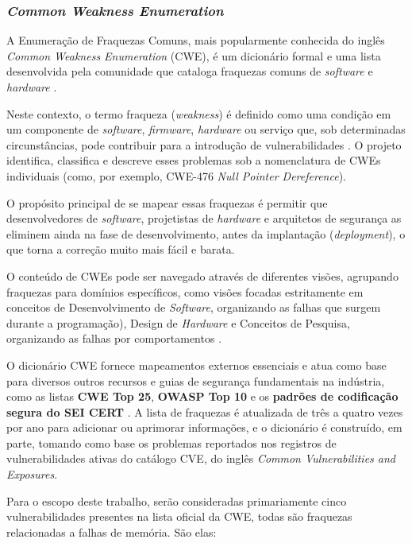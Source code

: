 \documentclass[
    12pt,                %
    openright,           %
    oneside,             %
    a4paper,             %
    english,             %
    brazil               %
]{abntex2}
\begin{document}
\begin{itemize}
\subsubsection{\textit{Common Weakness Enumeration}}
\label{sec:cwes}
\par
A Enumeração de Fraquezas Comuns, mais popularmente conhecida do inglês \textit{Common Weakness Enumeration} (CWE), é um dicionário formal e uma lista desenvolvida pela comunidade que cataloga fraquezas comuns de \textit{software} e \textit{hardware} \cite{mitrecwe}.
\par
Neste contexto, o termo fraqueza (\textit{weakness}) é definido como uma condição em um componente de \textit{software}, \textit{firmware}, \textit{hardware} ou serviço que, sob determinadas circunstâncias, pode contribuir para a introdução de vulnerabilidades \cite{mitrecwe}.
O projeto identifica, classifica e descreve esses problemas sob a nomenclatura de CWEs individuais (como, por exemplo, CWE-476 \textit{Null Pointer Dereference}).
\par
O propósito principal de se mapear essas fraquezas é permitir que desenvolvedores de \textit{software}, projetistas de \textit{hardware} e arquitetos de segurança as eliminem ainda na fase de desenvolvimento, antes da implantação (\textit{deployment}), o que torna a correção muito mais fácil e barata.
\par 
O conteúdo de CWEs pode ser navegado através de diferentes visões, agrupando fraquezas para domínios específicos, como visões focadas estritamente em conceitos de Desenvolvimento de \textit{Software}, organizando as falhas que surgem durante a programação), Design de \textit{Hardware} e Conceitos de Pesquisa, organizando as falhas por comportamentos \cite{mitrecwe}.
\par
O dicionário CWE fornece mapeamentos externos essenciais e atua como base para diversos outros recursos e guias de segurança fundamentais na indústria, como as listas \textbf{CWE Top 25}, \textbf{OWASP Top 10} e os \textbf{padrões de codificação segura do SEI CERT} \cite{mitrecwe, seicertc2016}.
A lista de fraquezas é atualizada de três a quatro vezes por ano para adicionar ou aprimorar informações, e o dicionário é construído, em parte, tomando como base os problemas reportados nos registros de vulnerabilidades ativas do catálogo CVE, do inglês \textit{Common Vulnerabilities and Exposures}.
\par
Para o escopo deste trabalho, serão consideradas primariamente cinco vulnerabilidades presentes na lista oficial da CWE, todas são fraquezas relacionadas a falhas de memória.
São elas:


\end{itemize}
\end{document}
